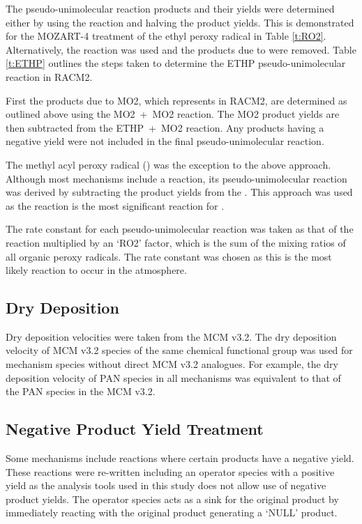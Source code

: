 The pseudo-unimolecular reaction products and their yields were determined either by using the  reaction and halving the product yields. 
This is demonstrated for the MOZART-4 treatment of the ethyl peroxy radical in Table \ref{t:RO2}. 
Alternatively, the  reaction was used and the products due to  were removed. 
Table \ref{t:ETHP} outlines the steps taken to determine the ETHP pseudo-unimolecular reaction in RACM2. 

First the products due to MO2, which represents  in RACM2, are determined as outlined above using the \mbox{MO2 + MO2} reaction. 
The MO2 product yields are then subtracted from the \mbox{ETHP + MO2} reaction. 
Any products having a negative yield were not included in the final pseudo-unimolecular reaction.

The methyl acyl peroxy radical () was the exception to the above approach. 
Although most mechanisms include a \mbox{} reaction, its pseudo-unimolecular reaction was derived by subtracting the  product yields from the \mbox{}. 
This approach was used as the \mbox{} reaction is the most significant reaction for .

The rate constant for each pseudo-unimolecular reaction was taken as that of the \mbox{} reaction multiplied by an `RO2' factor, which is the sum of the mixing ratios of all organic peroxy radicals. 
The \mbox{} rate constant was chosen as this is the most likely reaction to occur in the atmosphere. 

\subsection{Dry Deposition}

Dry deposition velocities were taken from the MCM v3.2. 
The dry deposition velocity of MCM v3.2 species of the same chemical functional group was used for mechanism species without direct MCM v3.2 analogues. 
For example, the dry deposition velocity of PAN species in all mechanisms was equivalent to that of the PAN species in the MCM v3.2.

\subsection{Negative Product Yield Treatment}

Some mechanisms include reactions where certain products have a negative yield. 
These reactions were re-written including an operator species with a positive yield as the analysis tools used in this study does not allow use of negative product yields. 
The operator species acts as a sink for the original product by immediately reacting with the original product generating a `NULL' product. 

